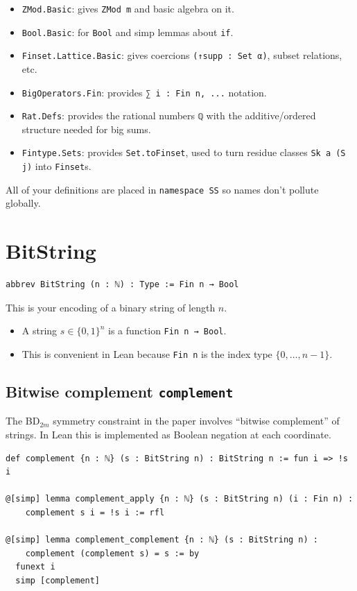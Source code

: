 \documentclass[11pt]{article}
\begin{document}
\begin{itemize}
\item \texttt{ZMod.Basic}: gives \texttt{ZMod m} and basic algebra on it.
\item \texttt{Bool.Basic}: for \texttt{Bool} and simp lemmas about \texttt{if}.
\item \texttt{Finset.Lattice.Basic}: gives coercions \texttt{(↑supp : Set α)}, subset relations, etc.
\item \texttt{BigOperators.Fin}: provides \texttt{∑ i : Fin n, ...} notation.
\item \texttt{Rat.Defs}: provides the rational numbers \texttt{ℚ} with the additive/ordered structure needed for big sums.
\item \texttt{Fintype.Sets}: provides \texttt{Set.toFinset}, used to turn residue classes \texttt{Sk a (S j)} into \texttt{Finset}s.
\end{itemize}

All of your definitions are placed in \texttt{namespace SS} so names don't pollute globally.

\section*{BitString}

\begin{lstlisting}
abbrev BitString (n : ℕ) : Type := Fin n → Bool
\end{lstlisting}

This is your encoding of a binary string of length $n$.

\begin{itemize}
\item A string $s\in\{0,1\}^n$ is a function \texttt{Fin n → Bool}.
\item This is convenient in Lean because \texttt{Fin n} is the index type $\{0,\dots,n-1\}$.
\end{itemize}

\subsection*{Bitwise complement \texttt{complement}}

The BD$_{2m}$ symmetry constraint in the paper involves ``bitwise complement'' of strings.
In Lean this is implemented as Boolean negation at each coordinate.

\begin{lstlisting}
def complement {n : ℕ} (s : BitString n) : BitString n := fun i => !s i

@[simp] lemma complement_apply {n : ℕ} (s : BitString n) (i : Fin n) :
    complement s i = !s i := rfl

@[simp] lemma complement_complement {n : ℕ} (s : BitString n) :
    complement (complement s) = s := by
  funext i
  simp [complement]
\end{lstlisting}
\end{document}
